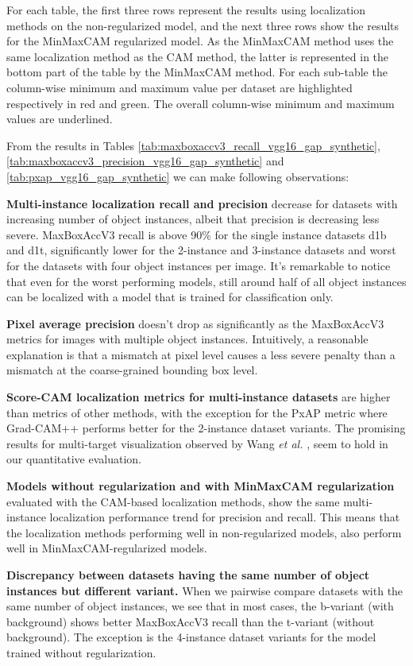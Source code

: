 For each table, the first three rows represent the results using localization methods on the non-regularized model, and the next three rows show the results for the MinMaxCAM regularized model. As the MinMaxCAM method uses the same localization method as the CAM method, the latter is represented in the bottom part of the table by the MinMaxCAM method. For each sub-table the column-wise minimum and maximum value per dataset are highlighted respectively in red and green. The overall column-wise minimum and maximum values are underlined. 

From the results in Tables \ref{tab:maxboxaccv3_recall_vgg16_gap_synthetic}, \ref{tab:maxboxaccv3_precision_vgg16_gap_synthetic} and \ref{tab:pxap_vgg16_gap_synthetic} we can make following observations:

\textbf{Multi-instance localization recall and precision} decrease for datasets with increasing number of object instances, albeit that precision is decreasing less severe. MaxBoxAccV3 recall is above 90\% for the single instance datasets d1b and d1t, significantly lower for the 2-instance and 3-instance datasets and worst for the datasets with four object instances per image. It's remarkable to notice that even for the worst performing models, still around half of all object instances can be localized with a model that is trained for classification only. 

\textbf{Pixel average precision} doesn't drop as significantly as the MaxBoxAccV3 metrics for images with multiple object instances. Intuitively, a reasonable explanation is that a mismatch at pixel level causes a less severe penalty than a mismatch at the coarse-grained bounding box level.

\textbf{Score-CAM localization metrics for multi-instance datasets} are higher than metrics of other methods, with the exception for the PxAP metric where Grad-CAM++ performs better for the 2-instance dataset variants. The promising results for multi-target visualization observed by Wang \textit{et al.} \cite{wang2020score}, seem to hold in our quantitative evaluation. 

\textbf{Models without regularization and with MinMaxCAM regularization} evaluated with the CAM-based localization methods, show the same multi-instance localization performance trend for precision and recall. This means that the localization methods performing well in non-regularized models, also perform well in MinMaxCAM-regularized models.

\textbf{Discrepancy between datasets having the same number of object instances but different variant.} When we pairwise compare datasets with the same number of object instances, we see that in most cases, the b-variant (with background) shows better MaxBoxAccV3 recall than the t-variant (without background). The exception is the 4-instance dataset variants for the model trained without regularization.


